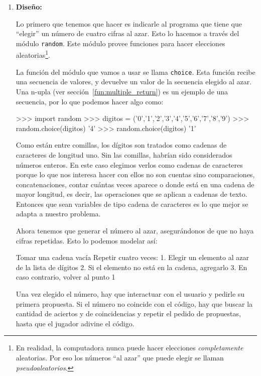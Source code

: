 \begin{enumerate}
\item {\bf Diseño:}
\label{str:disenno}

Lo primero que tenemos que hacer es indicarle al programa que tiene que
``elegir'' un número de cuatro cifras al azar. Esto lo hacemos a través del
módulo \lstinline!random!. Este módulo provee funciones para hacer elecciones
aleatorias\footnote{En realidad, la computadora nunca puede hacer
elecciones \emph{completamente} aleatorias. Por eso los números ``al azar''
que puede elegir se llaman \emph{pseudoaleatorios}.}.

La función del módulo que vamos a usar se llama \lstinline!choice!. Esta función
recibe una secuencia de valores, y devuelve un valor de la secuencia elegido al
azar. Una n-upla\label{mastermind} (ver sección~\ref{fun:multiple_return}) es un ejemplo de una
secuencia, por lo que podemos hacer algo como:

\begin{codigo-python-sn}
>>> import random
>>> digitos = ('0','1','2','3','4','5','6','7','8','9')
>>> random.choice(digitos)
'4'
>>> random.choice(digitos)
'1'
\end{codigo-python-sn}

Como están entre comillas, los dígitos son tratados como cadenas de caracteres
de longitud uno. Sin las comillas, habrían sido considerados números enteros. En
este caso elegimos verlos como cadenas de caracteres porque lo que nos interesa
hacer con ellos no son cuentas sino comparaciones, concatenaciones, contar
cuántas veces aparece o donde está en una cadena de mayor longitud, es decir,
las operaciones que se aplican a cadenas de texto. Entonces que sean
variables de tipo cadena de caracteres es lo que mejor se adapta a nuestro
problema.

Ahora tenemos que generar el número al azar, asegurándonos de que no haya cifras
repetidas. Esto lo podemos modelar así:

\begin{codigo-nohl-sn}
Tomar una cadena vacía
Repetir cuatro veces:
    1. Elegir un elemento al azar de la lista de dígitos
    2. Si el elemento no está en la cadena, agregarlo
    3. En caso contrario, volver al punto 1
\end{codigo-nohl-sn}

Una vez elegido el número, hay que interactuar con el usuario y pedirle su
primera propuesta. Si el número no coincide con el código, hay que buscar la
cantidad de aciertos y de coincidencias y repetir el pedido de propuestas, hasta
que el jugador adivine el código.


\end{enumerate}

